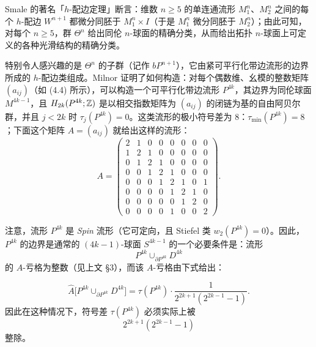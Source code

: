 Smale 的著名「$h$-配边定理」断言：维数 $n\ge5$ 的单连通流形 $M^n_1$、$M^n_2$ 之间的每个 $h$-配边 $W^{n+1}$ 都微分同胚于 $M^n_1\times I$（于是 $M^n_1$ 微分同胚于 $M^n_2$）；由此可知，对每个 $n\ge5$，群 $\Theta^n$ 给出同伦 $n$-球面的精确分类，从而给出拓扑 $n$-球面上可定义的各种光滑结构的精确分类。


特别令人感兴趣的是 $\Theta^n$ 的子群（记作 $bP^{n+1}$），它由紧可平行化带边流形的边界所成的 $h$-配边类组成。Milnor 证明了如何构造：对每个偶数维、幺模的整数矩阵 $(a_{ij})$（如 (4.4) 所示），可以构造一个可平行化带边流形 $P^{4k}$，其边界为同伦球面 $M^{4k-1}$，且 $H_{2k}(P^{4k};\mathbb{Z})$ 是以相交指数矩阵为 $(a_{ij})$ 的闭链为基的自由阿贝尔群，并且 $j<2k$ 时 $\tau_j(P^{4k})=0$。这类流形的极小符号差为 $8$：$\tau_{\min}(P^{4k})=8$；下面这个矩阵 $A=(a_{ij})$ 就给出这样的流形：
\begin{equation}
A=\begin{pmatrix}
2&1&0&0&0&0&0&0\\
1&2&1&0&0&0&0&0\\
0&1&2&1&0&0&0&0\\
0&0&1&2&1&0&0&0\\
0&0&0&1&2&1&0&1\\
0&0&0&0&1&2&1&0\\
0&0&0&0&0&1&2&0\\
0&0&0&0&1&0&0&2
\end{pmatrix}. \tag{4.4}
\end{equation}


注意，流形 $P^{4k}$ 是 \emph{Spin} 流形（它可定向，且 Stiefel 类 $w_2(P^{4k})=0$）。因此，$P^{4k}$ 的边界是通常的 $(4k-1)$-球面 $S^{4k-1}$ 的一个必要条件是：流形
\[
P^{4k}\cup_{\partial P^{4k}}D^{4k}
\]
的 $A$-亏格为整数（见上文 §3），而该 $A$-亏格由下式给出：

\[
\hat A\bigl[P^{4k}\cup_{\partial P^{4k}}D^{4k}\bigr]=\tau(P^{4k})\cdot\frac{1}{2^{2k+1}(2^{2k-1}-1)}.
\]
因此在这种情况下，符号差 $\tau(P^{4k})$ 必须实际上被
\[
2^{2k+1}(2^{2k-1}-1)
\]
整除。

